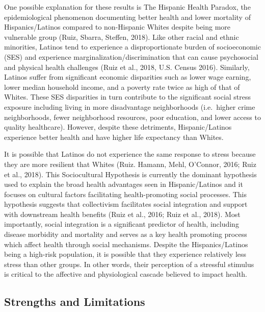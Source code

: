 \documentclass[man, fleqn, noextraspace]{apa6}
\begin{document}
One possible explanation for these results is The Hispanic Health Paradox, the epidemiological phenomenon documenting better health and lower mortality of Hispanics/Latinos compared to non-Hispanic Whites despite being more vulnerable group (Ruiz, Sbarra, Steffen, 2018). Like other racial and ethnic minorities, Latinos tend to experience a disproportionate burden of socioeconomic (SES) and experience marginalization/discrimination that can cause psychosocial and physical health challenges (Ruiz et al., 2018, U.S. Census 2016). Similarly, Latinos suffer from significant economic disparities such as lower wage earning, lower median household income, and a poverty rate twice as high of that of Whites. These SES disparities in turn contribute to the significant social stress exposure including living in more disadvantage neighborhoods (i.e.~higher crime neighborhoods, fewer neighborhood resources, poor education, and lower access to quality healthcare). However, despite these detriments, Hispanic/Latinos experience better health and have higher life expectancy than Whites.

It is possible that Latinos do not experience the same response to stress because they are more resilient that Whites (Ruiz. Hamann, Mehl, O'Connor, 2016; Ruiz et al., 2018). This Sociocultural Hypothesis is currently the dominant hypothesis used to explain the broad health advantages seen in Hispanic/Latinos and it focuses on cultural factors facilitating health-promoting social processes. This hypothesis suggests that collectivism facilitates social integration and support with downstream health benefits (Ruiz et al., 2016; Ruiz et al., 2018). Most importantly, social integration is a significant predictor of health, including disease morbidity and mortality and serves as a key health promoting process which affect health through social mechanisms. Despite the Hispanics/Latinos being a high-risk population, it is possible that they experience relatively less stress than other groups. In other words, their perception of a stressful stimulus is critical to the affective and physiological cascade believed to impact health.

\hypertarget{strengths-and-limitations}{%
\subsection{Strengths and Limitations}\label{strengths-and-limitations}}
\end{document}
